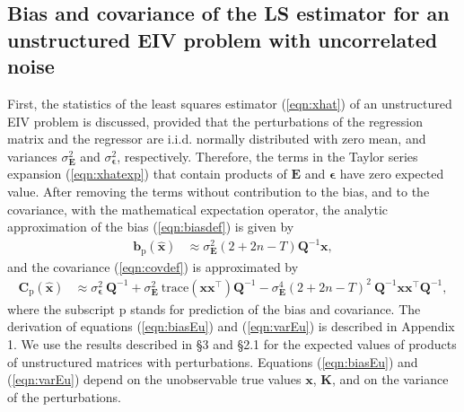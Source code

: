 \subsection{Bias and covariance of the LS estimator for an unstructured EIV problem with uncorrelated noise}

First, the statistics of the least squares estimator (\ref{eqn:xhat}) of an unstructured EIV problem is discussed, 
provided that the perturbations of the regression matrix and the regressor are i.i.d. normally distributed with zero mean, and variances $\sigma_{\mathbf{E}}^2$ and $\sigma_{\bm{\epsilon}}^2$, respectively.
Therefore, the terms in the Taylor series expansion (\ref{eqn:xhatexp}) that contain products of $\mathbf{E}$ and $\bm{\epsilon}$ have zero expected value.
 After removing the terms without contribution to the bias, and to the covariance, with the mathematical expectation operator,
the analytic approximation of the bias (\ref{eqn:biasdef}) is given by 
\begin{equation} \begin{aligned} \mathbf{b}_{\mathrm{p}} \left( \widehat{\mathbf{x}} \right) & \approx \sigma_{\mathbf{E}}^2 \left( 2 + 2n - T \right) \mathbf{Q}^{-1} \mathbf{x} , \end{aligned} \label{eqn:biasEu} \end{equation}
and the covariance (\ref{eqn:covdef}) is approximated by 
\begin{equation} \begin{aligned} \mathbf{C}_{\mathrm{p}} \left( \widehat{\mathbf{x}} \right) & \approx \sigma_{\bm{\epsilon}}^2 \ \mathbf{Q}^{-1} + \sigma_{\mathbf{E}}^2 \ \mathrm{trace} \left( \mathbf{x} \mathbf{x}^\top \right) \mathbf{Q}^{-1} - \sigma_{\mathbf{E}}^4 \left( 2 + 2n - T \right)^2 \ \mathbf{Q}^{-1} \mathbf{x} \mathbf{x}^\top \mathbf{Q}^{-1} , \end{aligned} \label{eqn:varEu} \end{equation}
where the subscript $\mathrm{p}$ stands for prediction of the bias and covariance.
The derivation of equations (\ref{eqn:biasEu}) and (\ref{eqn:varEu}) is described in Appendix 1.
We use the results described in \cite{Vaccaro94} \S 3 and \cite{Stewart90SPT} \S 2.1 for the expected values of products of unstructured matrices with perturbations.
Equations (\ref{eqn:biasEu}) and (\ref{eqn:varEu}) depend on the unobservable true values $\mathbf{x}$, $\mathbf{K}$, and on the variance of the perturbations.
